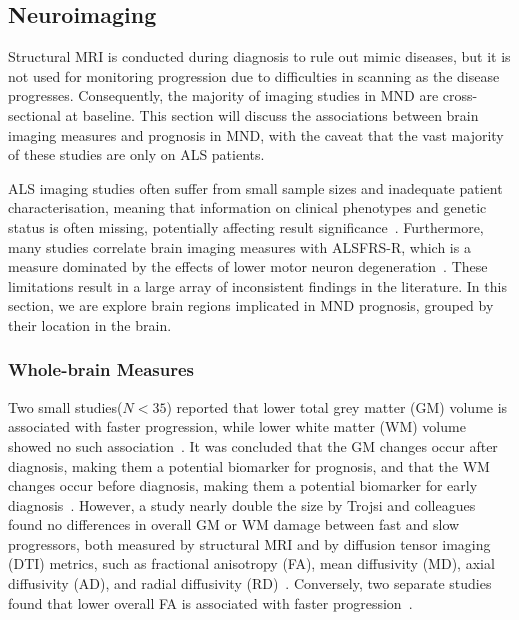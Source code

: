 \subsection{Neuroimaging}
Structural MRI is conducted during diagnosis to rule out mimic diseases, but it is not used for monitoring progression due to difficulties in scanning as the disease progresses.
Consequently, the majority of imaging studies in MND are cross-sectional at baseline.
This section will discuss the associations between brain imaging measures and prognosis in MND, with the caveat that the vast majority of these studies are only on ALS patients.

ALS imaging studies often suffer from small sample sizes and inadequate patient characterisation, meaning that information on clinical phenotypes and genetic status is often missing, potentially affecting result significance~\cite{bedeLessonsALSImaging2014}.
Furthermore, many studies correlate brain imaging measures with ALSFRS-R, which is a measure dominated by the effects of lower motor neuron degeneration~\cite{bedeLessonsALSImaging2014}.
These limitations result in a large array of inconsistent findings in the literature.
In this section, we are explore brain regions implicated in MND prognosis, grouped by their location in the brain.

\subsubsection*{Whole-brain Measures}
Two small studies($N<35$) reported that lower total grey matter (GM) volume is associated with faster progression, while lower white matter (WM) volume showed no such association~\cite{elmendiliAssociationBrainUpper2023, bedeLongitudinalStructuralChanges2018}.
It was concluded that the GM changes occur after diagnosis, making them a potential biomarker for prognosis, and that the WM changes occur before diagnosis, making them a potential biomarker for early diagnosis~\cite{bedeLongitudinalStructuralChanges2018}.
However, a study nearly double the size by Trojsi and colleagues found no differences in overall GM or WM damage between fast and slow progressors, both measured by structural MRI and by diffusion tensor imaging (DTI) metrics, such as fractional anisotropy (FA), mean diffusivity (MD), axial diffusivity (AD), and radial diffusivity (RD)~\cite{trojsiRestingStateFunctional2021}.
Conversely, two separate studies found that lower overall FA is associated with faster progression~\cite{sendaStructuralMRICorrelates2017, baldaranovLongitudinalDiffusionTensor2017}.

